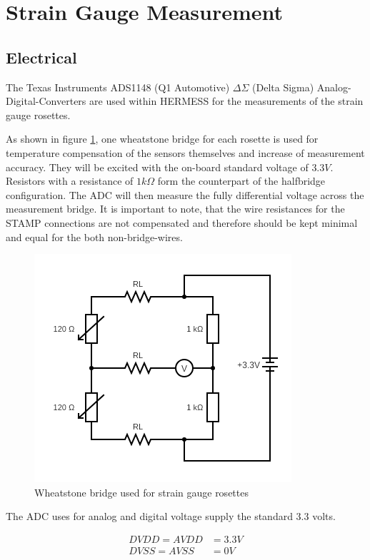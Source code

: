 \section{Strain Gauge Measurement}

\subsection{Electrical}
The Texas Instruments ADS1148 (Q1 Automotive) $\Delta\Sigma$ (Delta Sigma) Analog-Digital-Converters are used within HERMESS for the measurements of the strain gauge rosettes.

As shown in figure \ref{fig:wheatstone}, one wheatstone bridge for each rosette is used for temperature compensation of the sensors themselves and increase of measurement accuracy. They will be excited with the on-board standard voltage of $3.3V$. Resistors with a resistance of $1k\Omega$ form the counterpart of the halfbridge configuration. The ADC will then measure the fully differential voltage across the measurement bridge. It is important to note, that the wire resistances for the STAMP connections are not compensated and therefore should be kept minimal and equal for the both non-bridge-wires.

\begin{figure}[htb]
	\centering
	\includegraphics{ADC/wheatstone.png}
	\caption{Wheatstone bridge used for strain gauge rosettes}
	\label{fig:wheatstone}
\end{figure}

The ADC uses for analog and digital voltage supply the standard 3.3 volts.

\begin{equation}
\begin{split}
DVDD = AVDD &= 3.3V \\
DVSS = AVSS &= 0V
\end{split}
\end{equation}

